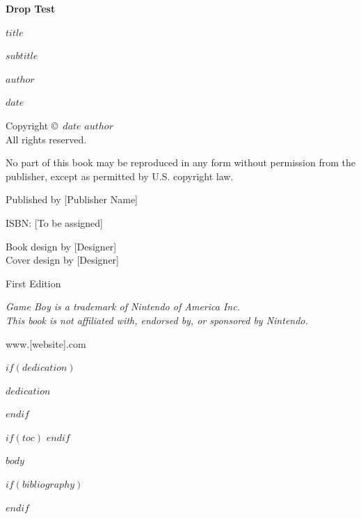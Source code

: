 \documentclass[11pt,twoside,openright]{book}
\newcommand{\halftitlepage}{%
    \thispagestyle{empty}
    \begin{center}
        \vspace*{0.3\textheight}
        {\Huge\sffamily\bfseries Drop Test}
    \end{center}
    \clearpage
}
\newcommand{\titlepage}{%
    \thispagestyle{empty}
    \begin{center}
        \vspace*{0.15\textheight}

        {\Huge\sffamily\bfseries $title$}

        \vspace{1em}

        {\LARGE\sffamily $subtitle$}

        \vfill

        {\Large\itshape $author$}

        \vspace{2em}

        {\large $date$}
    \end{center}
    \clearpage
}
\newcommand{\copyrightpage}{%
    \thispagestyle{empty}
    \null\vfill
    \begin{flushleft}
        \small
        Copyright \copyright\ $date$ $author$\\
        All rights reserved.

        \vspace{1em}

        No part of this book may be reproduced in any form without permission from the publisher, except as permitted by U.S. copyright law.

        \vspace{1em}

        Published by [Publisher Name]\\
        [Publisher Location]

        \vspace{1em}

        ISBN: [To be assigned]

        \vspace{1em}

        Book design by [Designer]\\
        Cover design by [Designer]

        \vspace{1em}

        First Edition

        \vspace{1em}

        \textit{Game Boy is a trademark of Nintendo of America Inc.\\
        This book is not affiliated with, endorsed by, or sponsored by Nintendo.}

        \vspace{1em}

        www.[website].com
    \end{flushleft}
    \clearpage
}
\begin{document}
\frontmatter

\halftitlepage

\titlepage

\copyrightpage

$if(dedication)$
\thispagestyle{empty}
\null\vfill
\begin{center}
\itshape
$dedication$
\end{center}
\vfill\vfill\null
\clearpage
$endif$

$if(toc)$
\tableofcontents
\clearpage
$endif$

\mainmatter

$body$

\backmatter

$if(bibliography)$


$endif$
\end{document}
